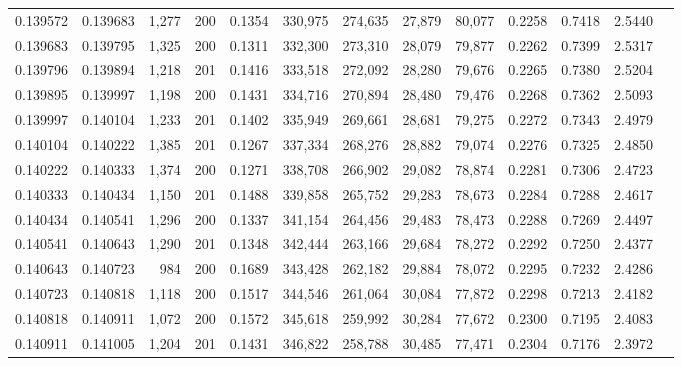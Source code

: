 \begin{tabular}{rrrrrrrrrrrrr}
0.139572 & 0.139683 &  1,277 & 200 &                                     0.1354 & 330,975 & 274,635 &  27,879 &  80,077 & 0.2258 & 0.7418 & 2.5440 \\
0.139683 & 0.139795 &  1,325 & 200 &                                     0.1311 & 332,300 & 273,310 &  28,079 &  79,877 & 0.2262 & 0.7399 & 2.5317 \\
0.139796 & 0.139894 &  1,218 & 201 &                                     0.1416 & 333,518 & 272,092 &  28,280 &  79,676 & 0.2265 & 0.7380 & 2.5204 \\
0.139895 & 0.139997 &  1,198 & 200 &                                     0.1431 & 334,716 & 270,894 &  28,480 &  79,476 & 0.2268 & 0.7362 & 2.5093 \\
0.139997 & 0.140104 &  1,233 & 201 &                                     0.1402 & 335,949 & 269,661 &  28,681 &  79,275 & 0.2272 & 0.7343 & 2.4979 \\
0.140104 & 0.140222 &  1,385 & 201 &                                     0.1267 & 337,334 & 268,276 &  28,882 &  79,074 & 0.2276 & 0.7325 & 2.4850 \\
0.140222 & 0.140333 &  1,374 & 200 &                                     0.1271 & 338,708 & 266,902 &  29,082 &  78,874 & 0.2281 & 0.7306 & 2.4723 \\
0.140333 & 0.140434 &  1,150 & 201 &                                     0.1488 & 339,858 & 265,752 &  29,283 &  78,673 & 0.2284 & 0.7288 & 2.4617 \\
0.140434 & 0.140541 &  1,296 & 200 &                                     0.1337 & 341,154 & 264,456 &  29,483 &  78,473 & 0.2288 & 0.7269 & 2.4497 \\
0.140541 & 0.140643 &  1,290 & 201 &                                     0.1348 & 342,444 & 263,166 &  29,684 &  78,272 & 0.2292 & 0.7250 & 2.4377 \\
0.140643 & 0.140723 &    984 & 200 &                                     0.1689 & 343,428 & 262,182 &  29,884 &  78,072 & 0.2295 & 0.7232 & 2.4286 \\
0.140723 & 0.140818 &  1,118 & 200 &                                     0.1517 & 344,546 & 261,064 &  30,084 &  77,872 & 0.2298 & 0.7213 & 2.4182 \\
0.140818 & 0.140911 &  1,072 & 200 &                                     0.1572 & 345,618 & 259,992 &  30,284 &  77,672 & 0.2300 & 0.7195 & 2.4083 \\
0.140911 & 0.141005 &  1,204 & 201 &                                     0.1431 & 346,822 & 258,788 &  30,485 &  77,471 & 0.2304 & 0.7176 & 2.3972 \\

\end{tabular}
